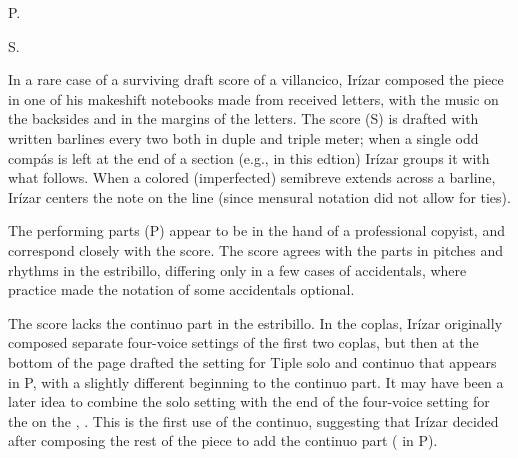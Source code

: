 
\begin{notesources}

\item[P.] 

\item[S.] 

\end{notesources}

In a rare case of a surviving draft score of a villancico, Irízar composed the piece in one of his makeshift notebooks made from received letters, with the music on the backsides and in the margins of the letters.
The score (S) is drafted with written barlines every two  both in duple and triple meter; when a single odd compás is left at the end of a section (e.g.,  in this edtion) Irízar groups it with what follows.
When a colored (imperfected) semibreve extends across a barline, Irízar centers the note on the line (since mensural notation did not allow for ties).

The performing parts (P) appear to be in the hand of a professional copyist, and correspond closely with the score.
The score agrees with the parts in pitches and rhythms in the estribillo, differing only in a few cases of accidentals, where  practice made the notation of some accidentals optional.

The score lacks the  continuo part in the estribillo.
In the coplas, Irízar originally composed separate four-voice settings of the first two coplas, but then at the bottom of the page drafted the setting for Tiple solo and continuo that appears in P, with a slightly different beginning to the continuo part.
It may have been a later idea to combine the solo setting with the end of the four-voice setting for the  on the , .
This is the first use of the continuo, suggesting that Irízar decided after composing the rest of the piece to add the continuo part ( in P).

